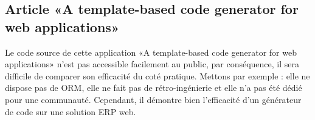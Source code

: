 

\subsection{Article «A template-based code generator for web applications»}
Le code source de cette application «A template-based code generator for web applications» n’est pas accessible facilement au public, par conséquence, il sera difficile de comparer son efficacité du coté pratique. Mettons par exemple : elle ne dispose pas de ORM, elle ne fait pas de rétro-ingénierie et elle n'a pas été dédié pour une communauté. Cependant, il démontre bien l'efficacité d'un générateur de code sur une solution ERP web.
